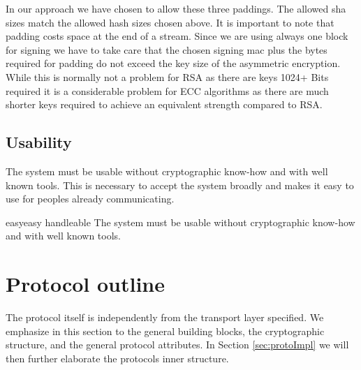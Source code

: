 In our approach we have chosen to allow these three paddings. The allowed sha sizes match the allowed hash sizes chosen above. It is important to note that padding costs space at the end of a stream. Since we are using always one block for signing we have to take care that the chosen signing mac plus the bytes required for padding do not exceed the key size of the asymmetric encryption. While this is normally not a problem for RSA as there are keys 1024+ Bits required it is a considerable problem for ECC algorithms as there are much shorter keys required to achieve an equivalent strength compared to RSA.

\subsection{Usability}
The system must be usable without cryptographic know-how and with well known tools. This is necessary to accept the system broadly and makes it easy to use for peoples already communicating.

\begin{requirement}{easy}{easy handleable}
	The system must be usable without cryptographic know-how and with well known tools.
\end{requirement}

\section{Protocol outline}
The protocol itself is independently from the transport layer specified. We emphasize in this section to the general building blocks, the cryptographic structure, and the general protocol attributes. In Section \ref{sec:protoImpl} we will then further elaborate the protocols inner structure.

